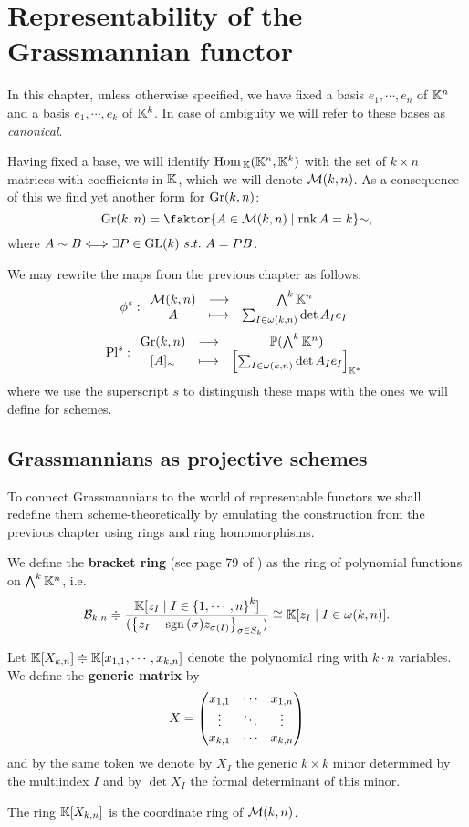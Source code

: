 \chapter{Representability of the Grassmannian functor}
In this chapter, unless otherwise specified, we have fixed a basis $e_1,\cdots, e_n$ of $\mathbb{K}^n$ and a basis $e_1,\cdots, e_k$ of $\mathbb{K}^k$. In case of ambiguity we will refer to these bases as \textit{canonical}.
\medskip

\noindent Having fixed a base, we will identify $\mathrm{Hom}\,_{\mathbb{K}}(\mathbb{K}^n,\mathbb{K}^k)$ with the set of $k\times n$ matrices with coefficients in $\mathbb{K}$, which we will denote $\mathcal{M}(k,n)$. As a consequence of this we find yet another form for $\mathrm{Gr}(k,n)$:
\[\Gr(k,n)=\quot{\cpa{A\in \Mc(k,n)\mid \rnk A=k}}{\sim},\] 
where $A\sim B\Longleftrightarrow \exists P\in \mathrm{GL}(k)\ s.t.\ A=PB$.
\bigskip

\noindent We may rewrite the maps from the previous chapter as follows:
\[\phi^s:\begin{array}{ccc} {\mathcal{M}(k,n)} & \longrightarrow & {\bigwedge^k\mathbb{K}^n}\\ {A} & \longmapsto & {\sum_{I\in \omega(k,n)}\det A_I e_I} \end{array}\]
\[\mathrm{Pl}^s:\begin{array}{ccc} {\mathrm{Gr}(k,n)} & \longrightarrow & {\mathbb{P}(\bigwedge^k\mathbb{K}^n)}\\ {[A]_\sim} & \longmapsto & {\left[{\sum_{I\in \omega(k,n)}\det A_I e_I}\right]_{\mathbb{K}^\ast}} \end{array}\]
where we use the superscript $s$ to distinguish these maps with the ones we will define for schemes.

\section{Grassmannians as projective schemes}
To connect Grassmannians to the world of representable functors we shall redefine them scheme-theoretically by emulating the construction from the previous chapter using rings and ring homomorphisms.

\begin{definition}
We define the \textbf{bracket ring} (see page 79 of \cite{matroids}) as the ring of polynomial functions on $\bigwedge^k\mathbb{K}^n$, i.e.
\[\mathcal{B}_{k,n}\doteqdot\frac{\mathbb{K}[z_I\mid I\in \left\{{1,\cdots, n}\right\}^k]}{(\left\{{z_I-\mathrm{sgn}\,(\sigma)z_{\sigma(I)}}\right\}_{\sigma\in S_k})}\cong \mathbb{K}[z_I\mid I\in \omega(k,n)].\]
\end{definition}

\begin{definition}
Let $\mathbb{K}[X_{k,n}]\doteqdot\mathbb{K}[x_{1,1},\cdots,x_{k,n}]$ denote the polynomial ring with $k\cdot n$ variables. We define the \textbf{generic matrix} by
\[X=\begin{pmatrix}
    x_{1,1} & \cdots & x_{1,n}\\
    \vdots & \ddots & \vdots\\
    x_{k,1} &\cdots & x_{k,n}\end{pmatrix}\]
and by the same token we denote by $X_I$ the generic $k\times k$ minor determined by the multiindex $I$ and by $\det X_I$ the formal determinant of this minor.
\end{definition}
\begin{remark}
The ring $\mathbb{K}[X_{k,n}]$ is the coordinate ring of $\mathcal{M}(k,n)$. 
\end{remark}

